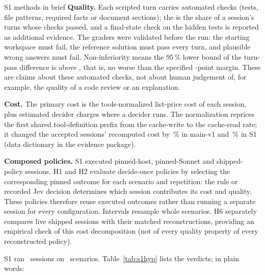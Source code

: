 \begin{casecard}{S1 methods in brief}
\textbf{Quality.} Each scripted turn carries automated checks (tests, file patterns, required facts or document
sections); the  is the share of a session's turns whose checks passed, and a final-state check
on the hidden tests is reported as additional evidence. The graders were validated before the run: the starting
workspace must fail, the reference solution must pass every turn, and plausible wrong answers must fail.
Non-inferiority means the 95\,\% lower bound of the turn-pass difference is above \NIMargin, that is, no worse than the
specified \NIMarginPts-point margin. These are claims about these automated checks, not about human judgement of, for
example, the quality of a code review or an explanation.

\textbf{Cost.} The primary cost is the tools-normalized list-price cost of each session, plus estimated decider charges
where a decider runs. The normalization reprices the first shared tool-definition prefix from the cache-write to the
cache-read rate; it changed the accepted sessions' recomputed cost by \NormShareMain\,\% in main-v1 and \NormShareSone\,\%
in S1 (data dictionary in the evidence package).

\textbf{Composed policies.} S1 executed pinned-host, pinned-Sonnet and shipped-policy sessions. H1 and H2 evaluate
decide-once policies by selecting the corresponding pinned outcome for each scenario and repetition: the rule or recorded
Jev decision determines which session contributes its cost and quality. These policies therefore reuse executed outcomes
rather than running a separate session for every configuration. Intervals resample whole scenarios. H6 separately
compares live shipped sessions with their matched reconstructions, providing an empirical check of this cost
decomposition (not of every quality property of every reconstructed policy).
\end{casecard}

\ifnum{}
S1 ran \SOneSessions\ sessions on \SOneScen\ scenarios. Table~\ref{tab:s1hyp} lists the verdicts; in plain words:
